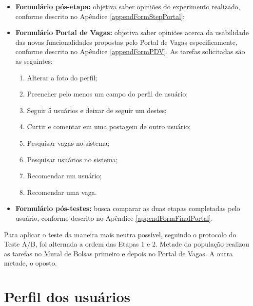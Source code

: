 \begin{itemize}
    \item \textbf{Formulário pós-etapa:} objetiva saber opiniões do experimento realizado, conforme descrito no Apêndice \ref{appendFormStepPortal};
    
    \item \textbf{Formulário Portal de Vagas:} objetiva saber opiniões acerca da usabilidade das novas funcionalidades propostas pelo Portal de Vagas especificamente, conforme descrito no Apêndice \ref{appendFormPDV}. As tarefas solicitadas são as seguintes:
        \begin{enumerate}
            \item Alterar a foto do perfil;
            \item Preencher pelo menos um campo do perfil de usuário;
            \item Seguir 5 usuários e deixar de seguir um destes;
            \item Curtir e comentar em uma postagem de outro usuário;
            \item Pesquisar vagas no sistema;
            \item Pesquisar usuários no sistema;
            \item Recomendar um usuário;
            \item Recomendar uma vaga.
        \end{enumerate}
    
    \item \textbf{Formulário pós-testes:} busca comparar as duas etapas completadas pelo usuário, conforme descrito no Apêndice \ref{appendFormFinalPortal}.
\end{itemize}

Para aplicar o teste da maneira mais neutra possível, seguindo o protocolo do Teste A/B, foi alternada a ordem das Etapas 1 e 2. Metade da população realizou as tarefas no Mural de Bolsas primeiro e depois no Portal de Vagas. A outra metade, o oposto.

\section{Perfil dos usuários}
\label{avaliacaoPefil}


